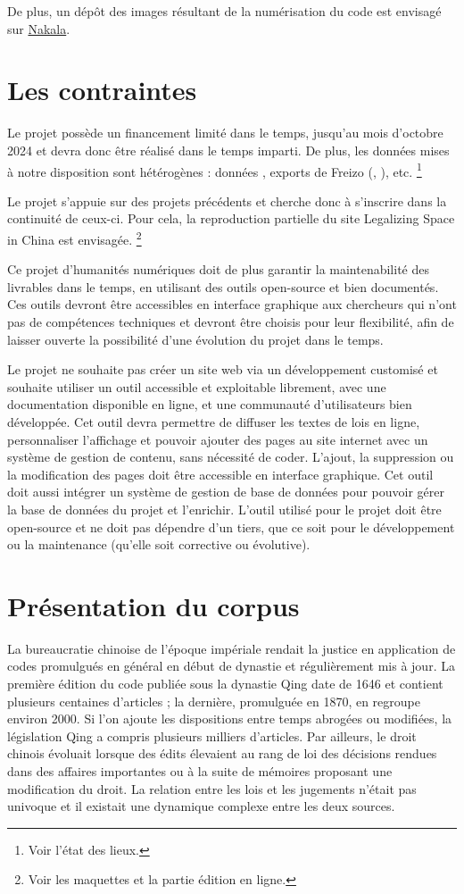 De plus, un dépôt des images résultant de la numérisation du code est envisagé sur \href{https://www.nakala.fr/about}{Nakala}. 

\newpage
\section*{Les contraintes}
Le projet \COREL possède un financement limité dans le temps, jusqu’au mois d’octobre 2024 et devra donc être réalisé dans le temps imparti. De plus, les données mises à notre disposition sont hétérogènes : données \XML, exports de Freizo (\csv, \JSON), etc. \footnote{Voir l’état des lieux. }

Le projet s’appuie sur des projets précédents et cherche donc à s’inscrire dans la continuité de ceux-ci. Pour cela, la reproduction partielle du site Legalizing Space in China est envisagée. \footnote{Voir les maquettes et la partie édition en ligne.}

Ce projet d’humanités numériques doit de plus garantir la maintenabilité des livrables dans le temps, en utilisant des outils open-source et bien documentés. Ces outils devront être accessibles en interface graphique aux chercheurs qui n’ont pas de compétences techniques et devront être choisis pour leur flexibilité, afin de laisser ouverte la possibilité d’une évolution du projet dans le temps. 

Le projet ne souhaite pas créer un site web via un développement customisé et souhaite utiliser un outil accessible et exploitable librement, avec une documentation disponible en ligne, et une communauté d’utilisateurs bien développée. Cet outil devra permettre de diffuser les textes de lois en ligne, personnaliser l’affichage et pouvoir ajouter des pages au site internet avec un système de gestion de contenu, sans nécessité de coder. L’ajout, la suppression ou la modification des pages doit être accessible en interface graphique. Cet outil doit aussi intégrer un système de gestion de base de données \XML pour pouvoir gérer la base de données du projet et l’enrichir. L’outil utilisé pour le projet doit être open-source et ne doit pas dépendre d’un tiers, que ce soit pour le développement ou la maintenance (qu’elle soit corrective ou évolutive).

\newpage
\section*{Présentation du corpus}
La bureaucratie chinoise de l’époque impériale rendait la justice en application de codes promulgués en général en début de dynastie et régulièrement mis à jour. La première édition du code publiée sous la dynastie Qing date de 1646 et contient plusieurs centaines d’articles ; la dernière, promulguée en 1870, en regroupe environ 2000. Si l’on ajoute les dispositions entre temps abrogées ou modifiées, la législation Qing a compris plusieurs milliers d’articles. Par ailleurs, le droit chinois évoluait lorsque des édits élevaient au rang de loi des décisions rendues dans des affaires importantes ou à la suite de mémoires proposant une modification du droit. La relation entre les lois et les jugements n’était pas univoque et il existait une dynamique complexe entre les deux sources.

